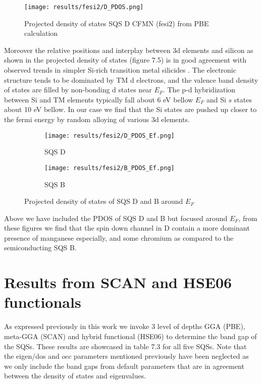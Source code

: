 \begin{figure}[H]
	\centering
	\texttt{[image: results/fesi2/D\_PDOS.png]}
	\caption{Projected density of states SQS D CFMN (fesi2) from PBE calculation}
\end{figure} 

Moreover the relative positions and interplay between 3d elements and silicon as shown in the projected density of states (figure 7.5) is in good agreement with observed trends in simpler Si-rich transition metal silicides \cite{lange1997electronic}. The electronic structure tends to be dominated by TM d electrons, and the valence band density of states are filled by non-bonding d states near $E_F$. The p-d hybridization between Si and TM elements typically fall about 6 eV bellow $E_F$ and Si $s$ states about 10 eV bellow. In our case we find that the Si states are pushed up closer to the fermi energy by random alloying of various 3d elements.    

  
\begin{figure}[H]
	\centering
	\begin{subfigure}{.45\textwidth}
			\texttt{[image: results/fesi2/D\_PDOS\_Ef.png]}
			\caption{SQS D}		
	\end{subfigure}
	\hspace{0.5cm}
	\begin{subfigure}{.45\textwidth}
		\texttt{[image: results/fesi2/B\_PDOS\_Ef.png]}
		\caption{SQS B}		
	\end{subfigure}
	\caption{Projected density of states of SQS D and B around $E_F$}
\end{figure}

Above we have included the PDOS of SQS D and B but focused around $E_F$, from these figures we find that the spin down channel in D contain a more dominant presence of manganese especially, and some chromium as compared to the semiconducting SQS B.  

\section{Results from SCAN and HSE06 functionals}
As expressed previously in this work we invoke 3 level of depths GGA (PBE), meta-GGA (SCAN) and hybrid functional (HSE06) to determine the band gap of the SQSs. These results are showcased in table 7.3 for all five SQSs. Note that the eigen/dos and $occ$ parameters mentioned previously have been neglected as we only include the band gaps from default parameters that are in agreement between the density of states and eigenvalues.
 
